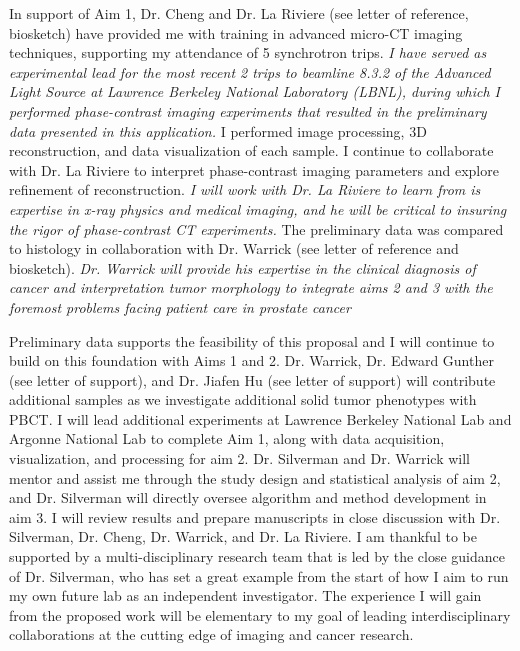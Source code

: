 \documentclass{NIHGrant}
\begin{document}
In support of Aim 1, Dr. Cheng and Dr. La Riviere (see letter of reference, biosketch) have provided me with training in advanced micro-CT imaging techniques, supporting my attendance of 5 synchrotron trips. \emph{I have served as experimental lead for the most recent 2 trips to beamline 8.3.2 of the Advanced Light Source at Lawrence Berkeley National Laboratory (LBNL), during which I performed phase-contrast imaging experiments that resulted in the preliminary data presented in this application.} I performed image processing, 3D reconstruction, and data visualization of each sample. I continue to collaborate with Dr. La Riviere to interpret phase-contrast imaging parameters and explore refinement of reconstruction. \emph{I will work with Dr. La Riviere to learn from is expertise in x-ray physics and medical imaging, and he will be critical to insuring the rigor of phase-contrast CT experiments.} The preliminary data was compared to histology in collaboration with Dr. Warrick (see letter of reference and biosketch). \emph{Dr. Warrick will provide his expertise in the clinical diagnosis of cancer and interpretation tumor morphology to integrate aims 2 and 3 with the foremost problems facing patient care in prostate cancer}

Preliminary data supports the feasibility of this proposal and I will continue to build on this foundation with Aims 1 and 2. Dr. Warrick, Dr. Edward Gunther (see letter of support), and Dr. Jiafen Hu (see letter of support) will contribute additional samples as we investigate additional solid tumor phenotypes with PBCT. I will lead additional experiments at Lawrence Berkeley National Lab and Argonne National Lab to complete Aim 1, along with data acquisition, visualization, and processing for aim 2. Dr. Silverman and Dr. Warrick will mentor and assist me through the study design and statistical analysis of aim 2, and Dr. Silverman will directly oversee algorithm and method development in aim 3. I will review results and prepare manuscripts in close discussion with Dr. Silverman, Dr. Cheng, Dr. Warrick, and Dr. La Riviere. I am thankful to be supported by a multi-disciplinary research team that is led by the close guidance of Dr. Silverman, who has set a great example from the start of how I aim to run my own future lab as an independent investigator. The experience I will gain from the proposed work will be elementary to my goal of leading interdisciplinary collaborations at the cutting edge of imaging and cancer research.


\end{document}
